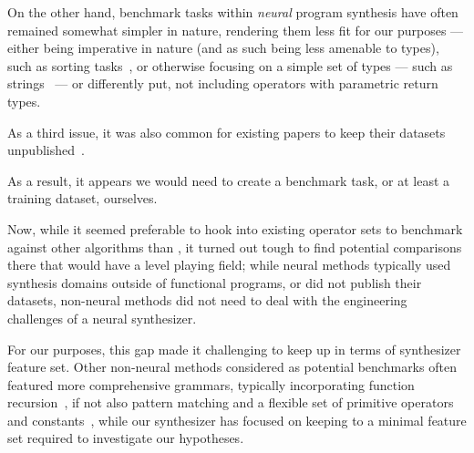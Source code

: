 \documentclass{article}
\begin{document}
On the other hand, benchmark tasks within \emph{neural} program synthesis have often remained somewhat simpler in nature,
rendering them less fit for our purposes ---
either being imperative in nature (and as such being less amenable to types),
such as sorting tasks~\citep{npi,alphanpi},
or otherwise focusing on a simple set of types --- such as strings~\citep{nsps} ---%
or differently put, not including operators with parametric return types.

As a third issue, it was also common for existing papers to keep their datasets unpublished~\citep{nsps,deepcoder}.

As a result, it appears we would need to create a benchmark task,
or at least a training dataset, ourselves.


Now, while it seemed preferable to hook into existing operator sets to benchmark against other algorithms than \citet{nsps},
it turned out tough to find potential comparisons there that would have a level playing field;
while neural methods typically used synthesis domains outside of functional programs,
or did not publish their datasets,
non-neural methods did not need to deal with the engineering challenges of a neural synthesizer.

For our purposes, this gap made it challenging to keep up in terms of synthesizer feature set.
Other non-neural methods considered as potential benchmarks often featured more comprehensive grammars,
typically incorporating function recursion~\citep{typedmil,myth},
if not also pattern matching and a flexible set of primitive operators and constants~\citep{lambda2},
while our synthesizer has focused on keeping to a minimal feature set required to investigate our hypotheses.

\end{document}
